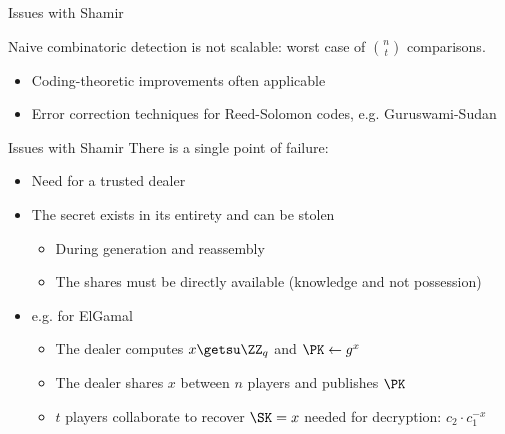 \begin{frame}{Issues with Shamir}
  \vspace*{1em}

  \pause
  \small
  Naive combinatoric detection is not scalable: worst case of $\binom{n}{t}$ comparisons.
  \vspace{-3mm}
  \begin{itemize}
    \footnotesize
    \item Coding-theoretic improvements often applicable
    \vspace{-2mm}
    \item Error correction techniques for Reed-Solomon codes, e.g. Guruswami-Sudan
  \end{itemize}
\end{frame}

\begin{frame}{Issues with Shamir}
  There is a single point of failure:
  \begin{itemize}[<+(1)->]
    \item Need for a trusted dealer
    \item The secret exists in its entirety and can be stolen
    \begin{itemize}
      \item During generation and reassembly
      \item The shares must be directly available (knowledge and not possession)
    \end{itemize}
    \item e.g. for ElGamal
    \begin{itemize}
      \item The dealer computes $x \getsu \ZZ_q$ and $\PK \gets g^x$
      \item The dealer shares $x$ between $n$ players and publishes $\PK$
      \item $t$ players collaborate to recover $\SK = x$ needed for decryption: $c_2 \cdot c_1^{-x}$
    \end{itemize}
  \end{itemize}
\end{frame}

